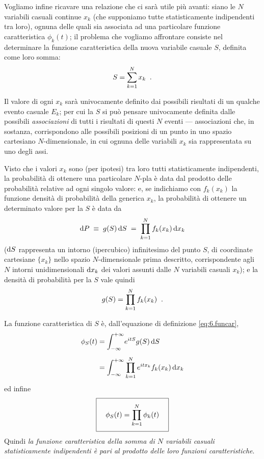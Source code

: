 Vogliamo infine ricavare una relazione che ci sar\`a utile
pi\`u avanti: siano le $N$ variabili casuali continue $x_k$
(che supponiamo tutte statisticamente indipendenti tra
loro), ognuna delle quali sia associata ad una particolare
funzione caratteristica $\phi_k(t)$; il problema che
vogliamo affrontare consiste nel determinare la funzione
caratteristica della nuova variabile casuale $S$, definita
come loro somma:
\begin{equation*}
  S = \sum_{k=1}^N x_k \;\; .
\end{equation*}

Il valore di ogni $x_k$ sar\`a univocamente definito dai
possibili risultati di un qualche evento casuale $E_k$; per
cui la $S$ si pu\`o pensare univocamente definita dalle
possibili \emph{associazioni} di tutti i risultati di questi
$N$ eventi --- associazioni che, in sostanza, corrispondono
alle possibili posizioni di un punto in uno spazio
cartesiano $N$-dimensionale, in cui ognuna delle variabili
$x_k$ sia rappresentata su uno degli assi.

%
Visto che i valori $x_k$ sono (per ipotesi) tra loro tutti
statisticamente indipendenti, la probabilit\`a di ottenere
una particolare $N$-pla \`e data dal prodotto delle
probabilit\`a relative ad ogni singolo valore: e, se
indichiamo con $f_k(x_k)$ la funzione densit\`a di
probabilit\`a della generica $x_k$, la probabilit\`a di
ottenere un determinato valore per la $S$ \`e data da
\begin{equation*}
  \mathrm{d} P \; \equiv \; g(S) \, \mathrm{d} S \; = \;
    \prod_{k=1}^N f_k(x_k) \, \mathrm{d} x_k
\end{equation*}
($\mathrm{d} S$ rappresenta un intorno (ipercubico) infinitesimo
del punto $S$, di coordinate cartesiane $\{ x_k \}$ nello
spazio $N$-dimensionale prima descritto, corrispondente agli
$N$ intorni unidimensionali $\mathrm{d} x_k$ dei valori assunti
dalle $N$ variabili casuali $x_k$); e la densit\`a di
probabilit\`a per la $S$ vale quindi
\begin{equation*}
  g(S) = \prod_{k=1}^N f_k(x_k) \;\; .
\end{equation*}

La funzione caratteristica di $S$ \`e, dall'equazione di
definizione \eqref{eq:6.funcar},
\begin{align*}
  \phi_S(t) &= \int_{-\infty}^{+\infty} \! e^{itS} g(S)
    \, \mathrm{d} S \\[1ex]
  &= \int_{-\infty}^{+\infty} \prod_{k=1}^N
    e^{itx_k} f_k(x_k) \, \mathrm{d} x_k
\end{align*}
ed infine
\begin{equation} \label{eq:6.fucacl}
  \boxed{ \rule[-6mm]{0mm}{14mm} \quad
    \phi_S(t) = \prod_{k=1}^N \phi_k(t)
    \quad }
\end{equation}
Quindi \emph{la funzione caratteristica della somma di $N$
  variabili casuali statisticamente indipendenti \`e pari al
  prodotto delle loro funzioni caratteristiche}.%


